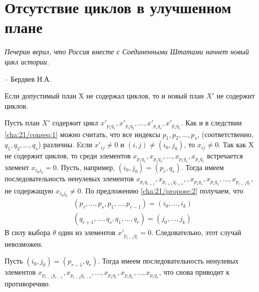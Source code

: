 \chapter{Отсутствие циклов в улучшенном плане}
\label{cha:24}

\epigraph{
	\textit{Печерин верил, что Россия вместе с Соединенными Штатами начнет новый цикл истории.}}
{-- Бердяев Н.А.}

\begin{propose}\label{cha:24/propose:1}
	Если допустимый план X не содержал циклов, то и новый план $X'$ не содержит циклов.
\end{propose}
\begin{Proof}
	Пусть план $X'$ содержит цикл $x'_{p_1q_1}, x'_{p_1q_2}, \dots, x'_{p_sq_s}, x'_{p_sq_1}$. Как и в следствии \ref{cha:21/conseq:1} можно считать, что все индексы $p_1, p_2, \dots, p_s$, (соответственно, $q_1, q_2, \dots, q_s$) различны. Eсли $x'_{ij} \not = 0$ и $(i, j) \not = (i_0, j_0)$, то $x_{ij} \not = 0$. Так как X не содержит циклов, то среди элементов $x_{p_1q_1}, x_{p_1q_2}, \dots, x_{p_sq_s}, x_{p_sq_1}$ встречается элемент $x_{i_0j_0} = 0$. Пусть, например, $(i_0,j_0) = (p_r,q_r)$. Тогда имеем последовательность ненулевых элементов $x_{p_rq_{r+1}}, x_{p_{r+1}q_{r+1}}, , x_{p_sq_s}, x_{p_sq_1}, \dots, x_{p_{r−1}q_r}$, не содержащую $x_{i_0j_0} \not= 0$. По предложению \ref{cha:21/propose:2} получаем, что
	$$\begin{gathered}
		(p_r, \dots, p_s, p_1, \dots, p_{r−1}) = (i_0, \dots, i_k) \\
		(q_{r+1}, \dots, q_s, q_1, \dots, q_r) = (j_0, \dots, j_k)
	\end{gathered}$$
	В силу выбора $\theta$ один из элементов $x'_{p_{i−1}q_i} = 0$. Следовательно, этот случай невозможен.

	Пусть $(i_0, j_0) = (p_{r−1}, q_r)$. Тогда имеем последовательность ненулевых элементов $x_{p_{r−1}q_{r−1}}, x_{p_{r−2}q_{r−1}}, \dots, x_{p_1q_1}, x_{p_sq_1}, \dots, x_{p_rq_r}$, что снова приводит к противоречию.

\end{Proof}
